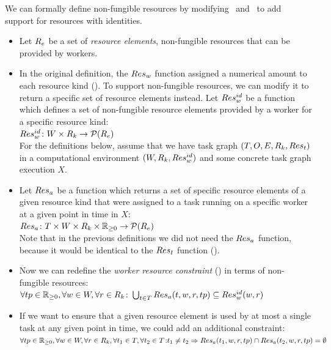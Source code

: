 We can formally define non-fungible resources by
modifying~
and~ to add support for resources
with identities.

\begin{itemize}[itemsep=0pt]
	\item Let $R_e$ be a set of \emph{resource elements}, non-fungible resources
	that can be provided by workers.
	\item In the original definition, the $Res_w$ function assigned a numerical amount to
	each resource kind (). To support non-fungible resources, we
	can modify it to return a specific set of resource elements instead.
	Let $Res_w^{id}$ be a function which defines a set of non-fungible resource elements	provided by a worker for a specific resource kind: \\
	$Res_w^{id}\colon W \times R_k \rightarrow \mathcal{P}(R_e)$ \\
	For the definitions below, assume that we have
	task graph $(T, O, E, R_k, Res_t)$ in a computational environment $(W, R_k, Res_w^{id})$ and some concrete task graph execution $X$.
	\item Let $Res_a$ be a function which returns a set of specific resource elements
	of a given resource kind that
	were assigned to a task running on a specific worker at a given point in time in $X$: \\
	$Res_a\colon T \times W \times R_k \times \mathbb{R}_{\geq{}0} \rightarrow \mathcal{P}(R_e)$ \\
	Note that in the previous definitions we did not need the $Res_a$ function, because it
	would be identical to the $Res_t$ function ().
	\item Now we can redefine the \emph{worker resource constraint} () in terms of non-fungible resources: \\
	$\forall tp\in\mathbb{R}_{\geq{}0}, \forall w\in{}W, \forall r\in{}R_k\colon
	\bigcup_{t\in{}T} Res_a(t, w, r, tp) 	\subseteq Res_w^{id}(w, r)$
	\item If we want to ensure that a given resource element is used by at most a single task at
	any given point in time, we could add an additional constraint: \\
	$\forall tp\in\mathbb{R}_{\geq{}0}, \forall w\in{}W, \forall r\in{}R_k, \forall t_1\in{}T, \forall t_2\in{}T\colon \\t_1 \neq t_2 \Rightarrow Res_a(t_1, w, r, tp) \cap Res_a(t_2, w, r, tp) = \emptyset$ \\

\end{itemize}
